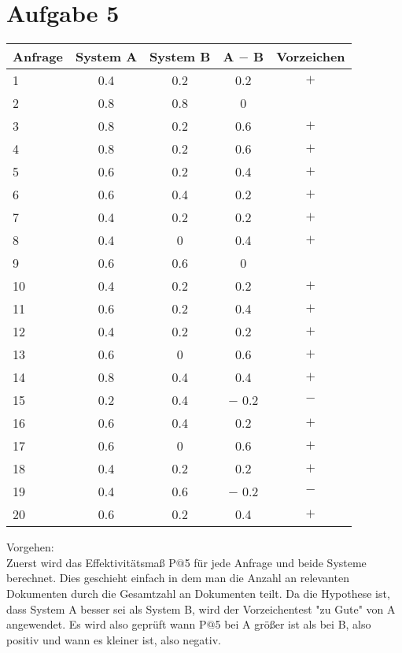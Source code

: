 \section*{Aufgabe 5}
\begin{center}
\begin{tabular}{|l|c|c|c|c|}
\hline 
Anfrage & System A & System B & A $ - $ B & Vorzeichen\\ 
\hline 
1 & 0.4 & 0.2 & 0.2 & $+$\\ 
\hline 
2 & 0.8 & 0.8 & 0 & \\ 
\hline 
3 & 0.8 & 0.2 & 0.6 & $+$\\ 
\hline 
4 & 0.8 & 0.2 & 0.6 & $+$\\ 
\hline 
5 & 0.6 & 0.2 & 0.4 & $+$\\ 
\hline 
6 & 0.6 & 0.4 & 0.2 & $+$\\ 
\hline 
7 & 0.4 & 0.2 & 0.2 & $+$\\ 
\hline 
8 & 0.4 & 0 & 0.4 & $+$\\ 
\hline 
9 & 0.6 & 0.6 & 0 & \\ 
\hline 
10 & 0.4 & 0.2 & 0.2 & $+$\\ 
\hline 
11 & 0.6 & 0.2 & 0.4 & $+$\\ 
\hline 
12 & 0.4 & 0.2 & 0.2 & $+$\\ 
\hline 
13 & 0.6 & 0 & 0.6 & $+$\\ 
\hline 
14 & 0.8 & 0.4 & 0.4 & $+$\\ 
\hline 
15 & 0.2 & 0.4 & $ - $ 0.2 & $-$\\ 
\hline 
16 & 0.6 & 0.4 & 0.2 & $+$\\ 
\hline 
17 & 0.6 & 0 & 0.6 & $+$\\ 
\hline 
18 & 0.4 & 0.2 & 0.2 & $+$\\ 
\hline 
19 & 0.4 & 0.6 & $ - $ 0.2 & $-$\\ 
\hline 
20 & 0.6 & 0.2 & 0.4 & $+$\\ 
\hline 
\end{tabular}
\end{center}
\vspace{1cm}
Vorgehen:\\
Zuerst wird das Effektivitätsmaß P$@$5 für jede Anfrage und beide Systeme berechnet. Dies geschieht einfach in dem man die Anzahl an relevanten Dokumenten durch die Gesamtzahl an Dokumenten teilt. Da die Hypothese ist, dass System A besser sei als System B, wird der Vorzeichentest "zu Gute" von A angewendet. Es wird also geprüft wann P$@$5 bei A größer ist als bei B, also positiv und wann es kleiner ist, also negativ. 
